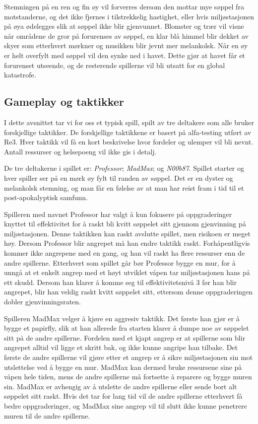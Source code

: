 Stemningen på en ren og fin øy vil forverres dersom den mottar mye søppel fra motstanderne, og det ikke fjernes i tilstrekkelig hastighet,
eller hvis miljøstasjonen på øya ødelegges slik at søppel ikke blir gjenvunnet.
Blomster og trær vil visne når områdene de gror på forurenses av søppel, en klar blå himmel blir dekket av skyer som etterhvert mørkner og
musikken blir jevnt mer melankolsk. 
Når en øy er helt overfylt med søppel vil den synke ned i havet. Dette gjør at havet får et forurenset utseende, og de resterende spillerne vil bli utsatt for en global katastrofe. %


\subsection{Gameplay og taktikker}

I dette avsnittet tar vi for oss et typisk spill, spilt av tre deltakere som alle bruker forskjellige taktikker. De forskjellige taktikkene er basert på alfa-testing utført av Re3. Hver taktikk vil få en kort beskrivelse hvor fordeler og ulemper vil bli nevnt. Antall ressurser og helsepoeng vil ikke gis i detalj.

De tre deltakerne i spillet er: \emph{Professor}; \emph{MadMax}; og \emph{N00b87}. Spillet starter og hver spiller ser på en mørk øy fylt til randen av søppel. Det er en dyster og melankolsk stemning, og man får en følelse av at man har reist fram i tid til et post-apokalyptisk samfunn.

Spilleren med navnet Professor har valgt å kun fokusere på oppgraderinger knyttet til effektivitet for å raskt bli kvitt søppelet sitt gjennom gjenvinning på miljøstasjonen. Denne taktikken kan raskt avslutte spillet, men risikoen er meget høy. Dersom Professor blir angrepet må han endre taktikk raskt. Forhåpentligvis kommer ikke angrepene med en gang, og han vil raskt ha flere ressurser enn de andre spillerne. Etterhvert som spillet går bør Professor bygge en mur, for å unngå at et enkelt angrep med et høyt utviklet våpen tar miljøstasjonen hans på ett skudd. Dersom han klarer å komme seg til effektivitetsnivå 3 før han blir angrepet, blir han veldig raskt kvitt søppelet sitt, ettersom denne oppgraderingen dobler gjenvinningsraten. 

Spilleren MadMax velger å kjøre en aggresiv taktikk. Det første han gjør er å bygge et papirfly, slik at han allerede fra starten klarer å dumpe noe av søppelet sitt på de andre spillerne. Fordelen med et kjapt angrep er at spillerne som blir angrepet alltid vil ligge et skritt bak, og ikke kunne angripe han tilbake. Det første de andre spillerne vil gjøre etter et angrep er å sikre miljøstasjonen sin mot utslettelse ved å bygge en mur. MadMax kan dermed bruke ressursene sine på våpen hele tiden, mens de andre spillerne må fortsette å reparere og bygge muren sin. MadMax er avhengig av å utslette de andre spillerne eller sende bort alt søppelet sitt raskt. Hvis det tar for lang tid vil de andre spillerne etterhvert få bedre oppgraderinger, og MadMax sine angrep vil til slutt ikke kunne penetrere muren til de andre spillerne.


